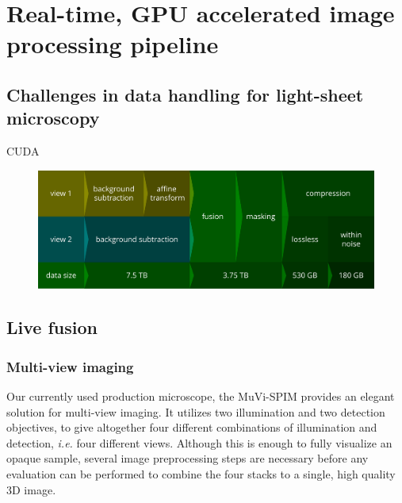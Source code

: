 

\chapter{Real-time, GPU accelerated image processing pipeline}

\graphicspath{{./figures/4_gpu/}}


\section{Challenges in data handling for light-sheet microscopy}


CUDA \cite{nickolls_scalable_2008}


\begin{figure}
  \centering
  \includegraphics[width=\textwidth]{pipeline}
  \label{fig:pipeline}
\end{figure}



\section{Live fusion}


\subsection{Multi-view imaging}

Our currently used production microscope, the MuVi-SPIM \cite{krzic_multiview_2012} provides an elegant solution for multi-view imaging. It utilizes two illumination and two detection objectives, to give altogether four different combinations of illumination and detection, \textit{i.e.} four different views. Although this is enough to fully visualize an opaque sample, several image preprocessing steps are necessary before any evaluation can be performed to combine the four stacks to a single, high quality 3D image.

